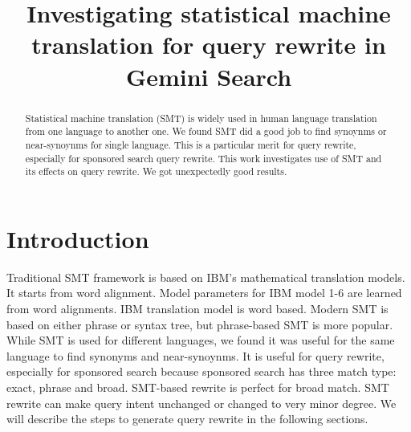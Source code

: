 \documentclass{sig-alternate}
\begin{document}
\sloppy
\newcommand{\para}[1]{\par \bigskip \noindent {\bf #1.}}
\newcommand{\spara}[1]{\par \bigskip \noindent {\sc #1.}}

\newcommand{\ymatrix}[1]{\mathbf{#1}}
\newcommand{\yvector}[1]{\mathbf{#1}}
\newcommand{\ytrans}[1]{#1^{\mathsf{T}}}

\newcommand{\yset}[1]{\mathcal{#1}}
\long{}
%

\title{Investigating statistical machine translation for query rewrite in Gemini Search}



\author{
}
\maketitle
\begin{abstract}
Statistical machine translation (SMT) is widely used in human language translation from one language to another one. We found SMT did a good job to find synoynms or near-synoynms for single language. This is a particular merit for query rewrite, especially for sponsored search query rewrite. This work investigates use of SMT and its effects on query rewrite. We got unexpectedly good results.

\end{abstract}



\section{Introduction}
Traditional SMT framework is based on IBM's mathematical translation models. It starts from word alignment.  Model parameters for IBM model 1-6 are learned from word alignments. IBM translation model is word based. Modern SMT is based on either phrase or syntax tree, but  phrase-based SMT is more popular. While SMT is used for different languages, we found it was useful for the same language to find synonyms and near-synoynms. It is useful for query rewrite, especially for sponsored search because sponsored search has three match type: exact, phrase and broad. SMT-based rewrite is perfect for broad match. SMT rewrite can make query intent unchanged or changed to very minor degree. We will describe the steps to generate query rewrite in the following sections.
\end{document}
